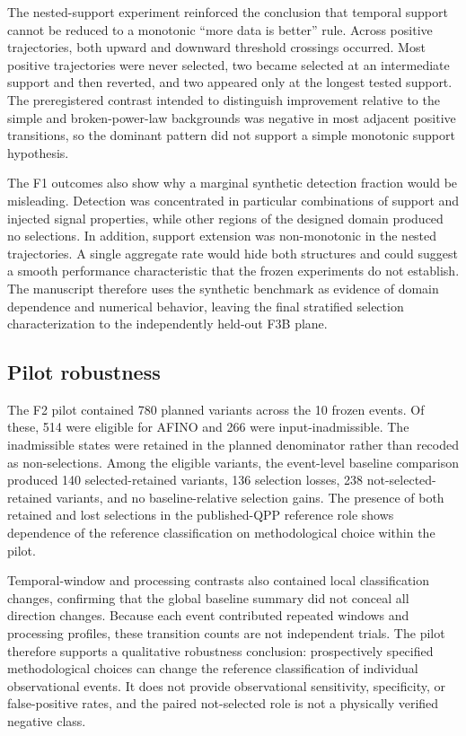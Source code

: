 \documentclass[manuscript,linenumbers]{aastex702}
\begin{document}
The nested-support experiment reinforced the conclusion that temporal support cannot be reduced to a monotonic ``more data is better'' rule. Across positive trajectories, both upward and downward threshold crossings occurred. Most positive trajectories were never selected, two became selected at an intermediate support and then reverted, and two appeared only at the longest tested support. The preregistered contrast intended to distinguish improvement relative to the simple and broken-power-law backgrounds was negative in most adjacent positive transitions, so the dominant pattern did not support a simple monotonic support hypothesis.

The F1 outcomes also show why a marginal synthetic detection fraction would be misleading. Detection was concentrated in particular combinations of support and injected signal properties, while other regions of the designed domain produced no selections. In addition, support extension was non-monotonic in the nested trajectories. A single aggregate rate would hide both structures and could suggest a smooth performance characteristic that the frozen experiments do not establish. The manuscript therefore uses the synthetic benchmark as evidence of domain dependence and numerical behavior, leaving the final stratified selection characterization to the independently held-out F3B plane.

\subsection{Pilot robustness}
The F2 pilot contained 780 planned variants across the 10 frozen events. Of these, 514 were eligible for AFINO and 266 were input-inadmissible. The inadmissible states were retained in the planned denominator rather than recoded as non-selections. Among the eligible variants, the event-level baseline comparison produced 140 selected-retained variants, 136 selection losses, 238 not-selected-retained variants, and no baseline-relative selection gains. The presence of both retained and lost selections in the published-QPP reference role shows dependence of the reference classification on methodological choice within the pilot.

Temporal-window and processing contrasts also contained local classification changes, confirming that the global baseline summary did not conceal all direction changes. Because each event contributed repeated windows and processing profiles, these transition counts are not independent trials. The pilot therefore supports a qualitative robustness conclusion: prospectively specified methodological choices can change the reference classification of individual observational events. It does not provide observational sensitivity, specificity, or false-positive rates, and the paired not-selected role is not a physically verified negative class.
\end{document}
